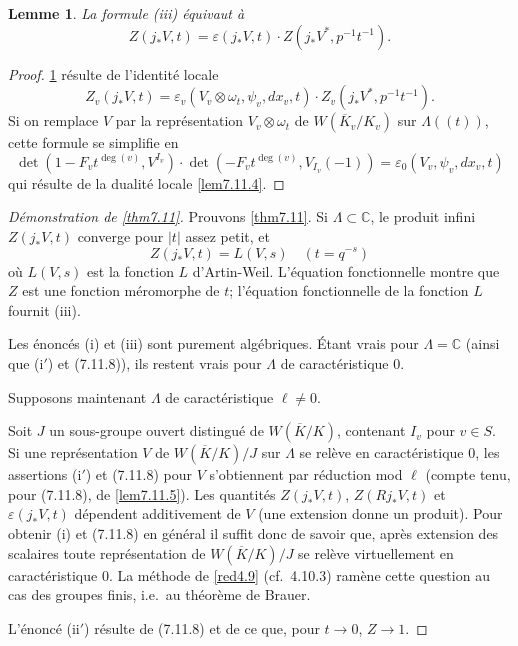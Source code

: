 \documentclass[11pt,a4paper]{amsart}
\theoremstyle{plain}
\newtheorem{lemma}[theorem]{Lemme}
\theoremstyle{definition}
\newcommand{\dbC}{\mathbb{C}}
\newcommand{\ov}[1]{\overline{#1}}
\newcommand{\eps}{\varepsilon}
\begin{document}
\begin{lemma}\label{lem7.11.7}
La formule (iii) \'equivaut \`a
\begin{equation}
Z(j_{*}V,t) = \eps(j_{*}V,t) \cdot Z(j_{*}V^{*}, p^{-1}t^{-1}).
\end{equation}
\end{lemma}

\begin{proof}
\ref{lem7.11.7} r\'esulte de l'identit\'e locale
\[
Z_{v}(j_{*}V,t) = \eps_{v}(V_{v} \otimes \omega_{t}, \psi_{v}, dx_{v}, t) \cdot Z_{v}(j_{*}V^{*}, p^{-1}t^{-1}).
\]
Si on remplace $V$ par la repr\'esentation $V_{v} \otimes \omega_{t}$ de $W(\ov{K}_{v}/K_{v})$ sur $\Lambda((t))$, cette formule se simplifie en
\[
\det(1 - F_{v}t^{\deg(v)}, V^{I_{v}}) \cdot \det(-F_{v}t^{\deg(v)}, V_{I_{v}}(-1)) = \eps_{0}(V_{v}, \psi_{v}, dx_{v}, t)
\]
qui r\'esulte de la dualit\'e locale \ref{lem7.11.4}.
\end{proof}

\begin{proof}[D\'emonstration de \ref{thm7.11}]
Prouvons \ref{thm7.11}. Si $\Lambda \subset \dbC$, le produit infini $Z(j_{*}V,t)$ converge pour $|t|$ assez petit, et
\[
Z(j_{*}V,t) = L(V,s) \quad (t = q^{-s})
\]
o\`u $L(V,s)$ est la fonction $L$ d'Artin-Weil. L'\'equation fonctionnelle montre que $Z$ est une fonction m\'eromorphe de $t$; l'\'equation fonctionnelle de la fonction $L$ fournit (iii).

Les \'enonc\'es (i) et (iii) sont purement alg\'ebriques. \'Etant vrais pour $\Lambda = \dbC$ (ainsi que (i$'$) et (7.11.8)), ils restent vrais pour $\Lambda$ de caract\'eristique $0$.

Supposons maintenant $\Lambda$ de caract\'eristique $\ell \not= 0$.

Soit $J$ un sous-groupe ouvert distingu\'e de $W(\ov{K}/K)$, contenant $I_{v}$ pour $v \in S$. Si une repr\'esentation $V$ de $W(\ov{K}/K)/J$ sur $\Lambda$ se rel\`eve en caract\'eristique $0$, les assertions (i$'$) et (7.11.8) pour $V$ s'obtiennent par r\'eduction mod $\ell$ (compte tenu, pour (7.11.8), de \ref{lem7.11.5}). Les quantit\'es $Z(j_{*}V,t)$, $Z(Rj_{*}V,t)$ et $\eps(j_{*}V,t)$ d\'ependent additivement de $V$ (une extension donne un produit). Pour obtenir (i) et (7.11.8) en g\'en\'eral il suffit donc de savoir que, apr\`es extension des scalaires toute repr\'esentation de $W(\ov{K}/K)/J$ se rel\`eve virtuellement en caract\'eristique $0$. La m\'ethode de \ref{red4.9} (cf.~4.10.3) ram\`ene cette question au cas des groupes finis, i.e.~au th\'eor\`eme de Brauer.

L'\'enonc\'e (ii$'$) r\'esulte de (7.11.8) et de ce que, pour $t \to 0$, $Z \to 1$.
\end{proof}
\end{document}
